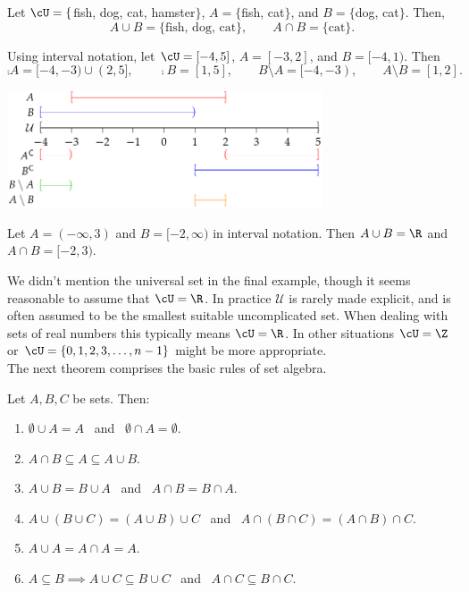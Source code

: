 \begin{examples}
\item Let $\cU=\{$fish, dog, cat, hamster$\}$, $A=\{$fish, cat$\}$, and $B=\{$dog, cat$\}$. Then,
\[A\cup B=\{\text{fish, dog, cat}\},\qquad A\cap B=\{\text{cat}\}.\]
\item Using interval notation, let $\cU=[-4,5]$, $A=[-3,2]$, and $B=[-4,1)$. Then
\[\comp A=[-4,-3)\cup (2,5],\qquad \comp B=[1,5],\qquad B\setminus A=[-4,-3),\qquad A\setminus B=[1,2].\]
\vspace{-24pt}
\begin{center}
\includegraphics[width=0.7\textwidth]{sets-13-intervalex}
\end{center}\vspace{-13pt}
\item Let $A=(-\infty,3)$ and $B=[-2,\infty)$ in interval notation. Then $A\cup B=\R$ and $A\cap B=[-2,3)$.
\end{examples}

\noindent We didn't mention the universal set in the final example, though it seems reasonable to assume that $\cU=\R$. In practice $\mathcal U$ is rarely made explicit, and is often assumed to be the smallest suitable uncomplicated set. When dealing with sets of real numbers this typically means $\cU=\R$. In other situations $\cU=\Z$ or $\cU=\{0,1,2,3,\ldots,n-1\}$ might be more appropriate.\\

The next theorem comprises the basic rules of set algebra.

\begin{thm}\label{thm:setbasic}
Let $A,B,C$ be sets. Then:
\begin{enumerate}\setlength{\itemsep}{0pt}
\item $\emptyset\cup A=A$ \ and \ $\emptyset\cap A=\emptyset$.
\item $A\cap B\subseteq A\subseteq A\cup B$.
\item $A\cup B=B\cup A$ \ and \ $A\cap B=B\cap A$.
\item $A\cup (B\cup C)=(A\cup B)\cup C$ \ and \ $A\cap (B\cap C)=(A\cap B)\cap C$.
\item $A\cup A=A\cap A=A$.
\item $A\subseteq B\implies A\cup C\subseteq B\cup C$ \ and \ $A\cap C\subseteq B\cap C$.
\end{enumerate}
\end{thm}


